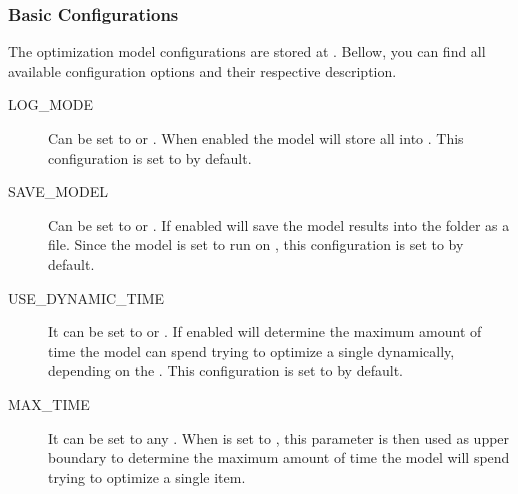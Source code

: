 \documentclass[letterpaper,10pt,english]{sphinxmanual}
\begin{document}
\subsubsection{Basic Configurations}
\label{\detokenize{source/optimization.configuration:basic-configurations}}
The optimization model configurations are stored at {\hyperref[\detokenize{source/optimization:module-optimization.constants}]{}}.
Bellow, you can find all available configuration options and their respective description.
\begin{description}
\item[{LOG\_MODE\label{\detokenize{source/optimization.configuration:term-LOG_MODE}}}] \leavevmode
Can be set to  or . When enabled the model will store all   into .
This configuration is set to  by default.

\item[{SAVE\_MODEL\label{\detokenize{source/optimization.configuration:term-SAVE_MODEL}}}] \leavevmode
Can be set to  or . If enabled will save the model results into the folder  as a  file. Since the model is set to run on , this configuration is set to  by default.

\item[{USE\_DYNAMIC\_TIME\label{\detokenize{source/optimization.configuration:term-USE_DYNAMIC_TIME}}}] \leavevmode
It can be set to  or . If enabled will determine the maximum amount of time the model can spend trying
to optimize a single  dynamically, depending on the .
This configuration is set to  by default.

\item[{MAX\_TIME\label{\detokenize{source/optimization.configuration:term-MAX_TIME}}}] \leavevmode
It can be set to any  . When  is set to , this parameter is then used as upper boundary
to determine the maximum amount of time the model will spend trying to optimize a single item. 


\end{description}
\end{document}
